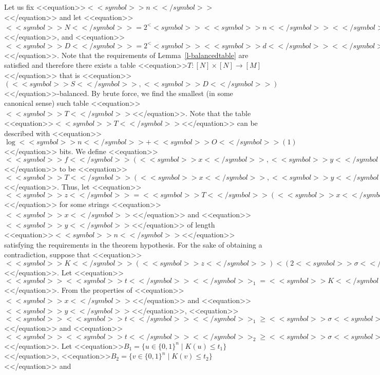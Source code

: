 \documentclass[proceedings]{stacs}
\def\zo{\{0,1\}}
\def\mapping{\rightarrow}
\begin{document}
\proof
Let us fix <<equation>>$<<symbol>>n<</symbol>>$<</equation>> and let <<equation>>$<<symbol>>N<</symbol>> = 2^<<symbol>><<symbol>>n<</symbol>><</symbol>>, <<symbol>>m<</symbol>> = 2<<symbol>>\sigma <<symbol>><</symbol>>n<</symbol>> - \log <<symbol>>n<</symbol>>, <<symbol>>M<</symbol>> = 2^<<symbol>><<symbol>>m<</symbol>><</symbol>>, <<symbol>>S<</symbol>>= 2^{<<symbol>><<symbol>>\sigma <<symbol>><</symbol>>n<</symbol>><</symbol>>}, <<symbol>>d<</symbol>> = <<symbol>>\alpha <<symbol>><</symbol>>n<</symbol>> + 8 \log <<symbol>>n<</symbol>>$<</equation>>, and <<equation>>$<<symbol>>D<</symbol>> = 2^<<symbol>><<symbol>>d<</symbol>><</symbol>>$<</equation>>. Note that the requirements of Lemma~\ref{l-balancedtable} are satisfied and therefore there exists a table <<equation>>$T: [N] \times [N] \mapping [M]$<</equation>> that is <<equation>>$(<<symbol>>S<</symbol>>,<<symbol>>D<</symbol>>)$<</equation>>-balanced. By brute force, we find the smallest (in some canonical sense) such table <<equation>>$<<symbol>>T<</symbol>>$<</equation>>. Note that the table <<equation>>$<<symbol>>T<</symbol>>$<</equation>> can be described with <<equation>>$\log <<symbol>>n<</symbol>> + <<symbol>>O<</symbol>>(1)$<</equation>> bits. We define <<equation>>$<<symbol>>f<</symbol>>(<<symbol>>x<</symbol>>,<<symbol>>y<</symbol>>)$<</equation>> to be <<equation>>$<<symbol>>T<</symbol>>(<<symbol>>x<</symbol>>,<<symbol>>y<</symbol>>)$<</equation>>. Thus, let <<equation>>$<<symbol>>z<</symbol>> = <<symbol>>T<</symbol>>(<<symbol>>x<</symbol>>,<<symbol>>y<</symbol>>)$<</equation>> for some strings <<equation>>$<<symbol>>x<</symbol>>$<</equation>> and <<equation>>$<<symbol>>y<</symbol>>$<</equation>> of length <<equation>>$<<symbol>>n<</symbol>>$<</equation>> satisfying the requirements in the theorem hypothesis.  For the sake of obtaining a contradiction, suppose that <<equation>>$<<symbol>>K<</symbol>>(<<symbol>>z<</symbol>>) <  (2<<symbol>>\sigma <</symbol>>- <<symbol>>\alpha<</symbol>>) <<symbol>>n<</symbol>> - 9 \log <<symbol>>n<</symbol>> = <<symbol>>m<</symbol>>-<<symbol>>d<</symbol>>$<</equation>>.
Let <<equation>>$<<symbol>><<symbol>>t<</symbol>><</symbol>>_1 = <<symbol>>K<</symbol>>(<<symbol>>x<</symbol>>), <<symbol>><<symbol>>t<</symbol>><</symbol>>_2 = <<symbol>>K<</symbol>>(<<symbol>>y<</symbol>>)$<</equation>>. From the properties of <<equation>>$<<symbol>>x<</symbol>>$<</equation>> and <<equation>>$<<symbol>>y<</symbol>>$<</equation>>, <<equation>>$<<symbol>><<symbol>>t<</symbol>><</symbol>>_1 \geq <<symbol>>\sigma <<symbol>><</symbol>>n<</symbol>>$<</equation>> and <<equation>>$<<symbol>><<symbol>>t<</symbol>><</symbol>>_2 \geq <<symbol>>\sigma <<symbol>><</symbol>>n<</symbol>>$<</equation>>. Let <<equation>>$B_1 = \{u \in \zo^n \mid K(u) \leq t_1 \}$<</equation>>, <<equation>>$B_2 = \{v \in \zo^n  \mid K(v) \leq t_2\}$<</equation>> and
\end{document}
